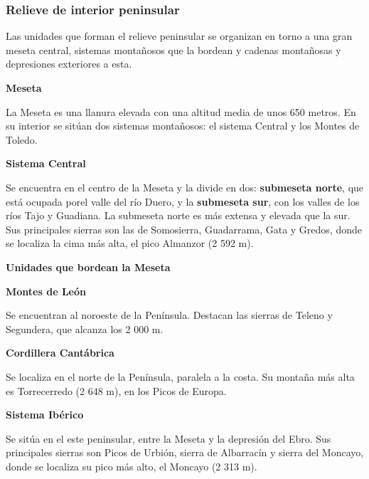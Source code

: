 \subsubsection{Relieve de interior peninsular}

Las unidades que forman el relieve peninsular se organizan en torno a una gran meseta central, sistemas montañosos que la bordean y cadenas montañosas y depresiones exteriores a esta.

\vspace{3mm}
\textbf{Meseta}

\vspace{3mm}
La Meseta es una llanura elevada con una altitud media de unos 650 metros. En su interior se sitúan dos sistemas montañosos: el sistema Central y los Montes de Toledo.

\vspace{3mm}
\textbf{Sistema Central}

\vspace{3mm}
Se encuentra en el centro de la Meseta y la divide en dos: \textbf{submeseta norte}, que está ocupada porel valle del río Duero, y la \textbf{submeseta sur}, con los valles de los ríos Tajo y Guadiana. La submeseta norte es más extensa y elevada que la sur. Sus principales sierras son las de Somosierra, Guadarrama, Gata y Gredos, donde se localiza la cima más alta, el pico Almanzor (2 592 m).

\vspace{3mm}
\textbf{Unidades que bordean la Meseta}

\vspace{3mm}
\textbf{Montes de León}

\vspace{3mm}
Se encuentran al noroeste de la Península. Destacan las sierras de Teleno y Segundera, que alcanza los 2 000 m.

\vspace{3mm}
\textbf{Cordillera Cantábrica}

\vspace{3mm}
Se localiza en el norte de la Península, paralela a la costa. Su montaña más alta es Torrecerredo (2 648 m), en los Picos de Europa.

\vspace{3mm}
\textbf{Sistema Ibérico}

\vspace{3mm}
Se sitúa en el este peninsular, entre la Meseta y la depresión del Ebro. Sus principales sierras son Picos de Urbión, sierra de Albarracín y sierra del Moncayo, donde se localiza su pico más alto, el Moncayo (2 313 m).

